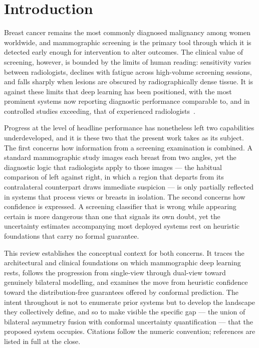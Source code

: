 \documentclass[12pt, a4paper]{article}
\begin{document}
\newpage
\tableofcontents
\newpage

\section{Introduction}

Breast cancer remains the most commonly diagnosed malignancy among women
worldwide, and mammographic screening is the primary tool through which it
is detected early enough for intervention to alter outcomes. The clinical
value of screening, however, is bounded by the limits of human reading:
sensitivity varies between radiologists, declines with fatigue across
high-volume screening sessions, and falls sharply when lesions are obscured
by radiographically dense tissue. It is against these limits that deep
learning has been positioned, with the most prominent systems now reporting
diagnostic performance comparable to, and in controlled studies exceeding,
that of experienced radiologists~\cite{McKinney2020, Wu2019}.

Progress at the level of headline performance has nonetheless left two
capabilities underdeveloped, and it is these two that the present work
takes as its subject. The first concerns how information from a screening
examination is combined. A standard mammographic study images each breast
from two angles, yet the diagnostic logic that radiologists apply to those
images --- the habitual comparison of left against right, in which a region
that departs from its contralateral counterpart draws immediate suspicion
--- is only partially reflected in systems that process views or breasts in
isolation. The second concerns how confidence is expressed. A screening
classifier that is wrong while appearing certain is more dangerous than one
that signals its own doubt, yet the uncertainty estimates accompanying most
deployed systems rest on heuristic foundations that carry no formal
guarantee.

This review establishes the conceptual context for both concerns. It traces
the architectural and clinical foundations on which mammographic deep
learning rests, follows the progression from single-view through dual-view
toward genuinely bilateral modelling, and examines the move from heuristic
confidence toward the distribution-free guarantees offered by conformal
prediction. The intent throughout is not to enumerate prior systems but to
develop the landscape they collectively define, and so to make visible the
specific gap --- the union of bilateral asymmetry fusion with conformal
uncertainty quantification --- that the proposed system occupies. Citations
follow the numeric convention; references are listed in full at the close.
\end{document}
